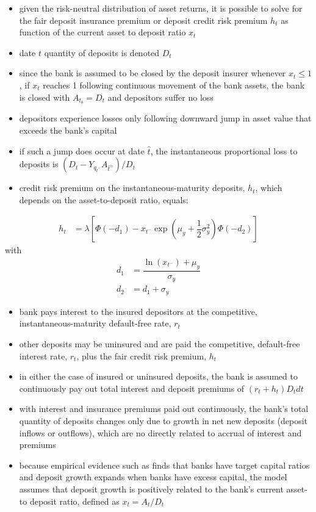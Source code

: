 \begin{itemize}
\item given the risk-neutral distribution of asset returns, it is possible to solve for the fair deposit insurance premium or deposit credit risk premium $h_t$ as function of the current asset to deposit ratio $x_t$
\item date $t$ quantity of deposits is denoted $D_t$
\item since the bank is assumed to be closed by the deposit insurer whenever $x_t \leq 1$, if $x_t$ reaches 1 following continuous movement of the bank assets, the bank is closed with $A_{t_{b}}=D_t$ and depositors suffer no loss 
\item depositors experience losses only following downward jump in asset value that exceeds the bank's capital
\item if such a jump does occur at date $\hat{t}$, the instantaneous proportional loss to deposits is $\left(D_t - Y_{q_{t^{-}}} A_{\hat{t^{-}}}  \right) / D_t$
\item credit risk premium on the instantaneous-maturity deposits, $h_t$, which depends on the asset-to-deposit ratio, equals:
\end{itemize}

\begin{align}
 h_t &=  \lambda \left[ \Phi\left( -d_1 \right) - x_{t^{-}} \exp\left( \mu_y + \dfrac{1}{2} \sigma_y^2 \right) \Phi\left( -d_2 \right)    \right]
\end{align}
with
\begin{align}
d_1 &= \dfrac{\ln\left( x_{t^{-}}\right) + \mu_y}{\sigma_y}\\
d_2 &= d_1 + \sigma_y
\end{align}

\begin{itemize}
\item bank pays interest to the insured depositors at the competitive, instantaneous-maturity default-free rate, $r_t$
\item other deposits may be uninsured and are paid the competitive, default-free interest rate, $r_t$, plus the fair credit risk premium, $h_t$
\item in either the case of insured or uninsured deposits, the bank is assumed to continuously pay out total interest and deposit premiums of $\left( r_t + h_t \right) D_t dt$
\end{itemize}

\begin{itemize}
\item with interest and insurance premiums paid out continuously, the bank's total quantity of deposits changes only due to growth in net new deposits (deposit inflows or outflows), which are no directly related to accrual of interest and premiums
\item because empirical evidence such as \citet{adrian2010liquidity} finds that banks have target capital ratios and deposit growth expands when banks have excess capital, the model assumes that deposit growth is positively related to the bank's current asset-to deposit ratio, defined as $x_t = A_t / D_t$
\end{itemize}

